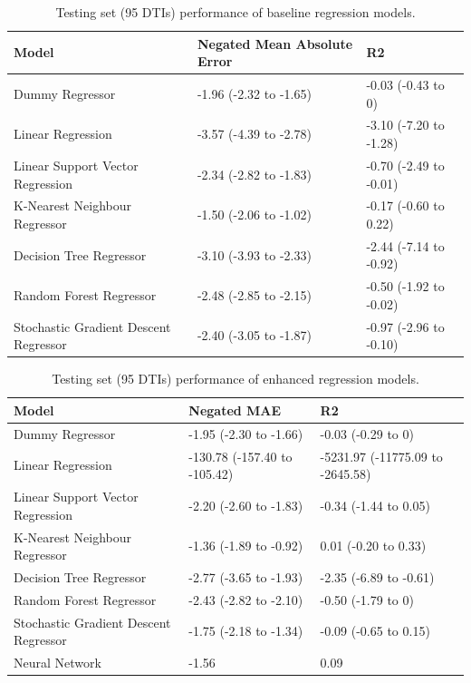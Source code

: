 \begin{table}
    \centering
    \begin{tabular}{lll}
    \toprule
                                    Model & Negated Mean Absolute Error &                     R2 \\
    \midrule
                          Dummy Regressor &      -1.96 (-2.32 to -1.65) &     -0.03 (-0.43 to 0) \\
                        Linear Regression &      -3.57 (-4.39 to -2.78) & -3.10 (-7.20 to -1.28) \\
         Linear Support Vector Regression &      -2.34 (-2.82 to -1.83) & -0.70 (-2.49 to -0.01) \\
            K-Nearest Neighbour Regressor &      -1.50 (-2.06 to -1.02) &  -0.17 (-0.60 to 0.22) \\
                  Decision Tree Regressor &      -3.10 (-3.93 to -2.33) & -2.44 (-7.14 to -0.92) \\
                  Random Forest Regressor &      -2.48 (-2.85 to -2.15) & -0.50 (-1.92 to -0.02) \\
    Stochastic Gradient Descent Regressor &      -2.40 (-3.05 to -1.87) & -0.97 (-2.96 to -0.10) \\
    \bottomrule
    \end{tabular}
    \caption{Testing set (95 DTIs) performance of baseline regression models.}
    \label{tbl:baseline_regression}
\end{table}

\begin{table}
    \centering
    \begin{tabular}{lll}
    \toprule
                                    Model &  Negated MAE &                               R2 \\
    \midrule
                          Dummy Regressor &       -1.95 (-2.30 to -1.66) &               -0.03 (-0.29 to 0) \\
                        Linear Regression & -130.78 (-157.40 to -105.42) & -5231.97 (-11775.09 to -2645.58) \\
         Linear Support Vector Regression &       -2.20 (-2.60 to -1.83) &            -0.34 (-1.44 to 0.05) \\
            K-Nearest Neighbour Regressor &       -1.36 (-1.89 to -0.92) &             0.01 (-0.20 to 0.33) \\
                  Decision Tree Regressor &       -2.77 (-3.65 to -1.93) &           -2.35 (-6.89 to -0.61) \\
                  Random Forest Regressor &       -2.43 (-2.82 to -2.10) &               -0.50 (-1.79 to 0) \\
    Stochastic Gradient Descent Regressor &       -1.75 (-2.18 to -1.34) &            -0.09 (-0.65 to 0.15) \\
                           Neural Network &                        -1.56 &                             0.09 \\
    \bottomrule
    \end{tabular}
    \caption{Testing set (95 DTIs) performance of enhanced regression models.}
    \label{tbl:enhanced_regression}
\end{table}

